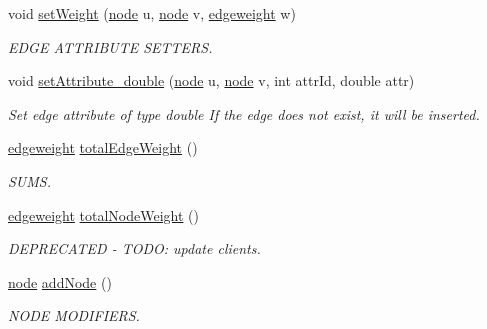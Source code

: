 \begin{DoxyCompactItemize}
\item 
void \hyperlink{class_ensemble_clustering_1_1_graph_a8e504170520b0746a2d169f82d863bab}{set\-Weight} (\hyperlink{namespace_ensemble_clustering_ae829290aeccd1a420b17a37fd901f114}{node} u, \hyperlink{namespace_ensemble_clustering_ae829290aeccd1a420b17a37fd901f114}{node} v, \hyperlink{namespace_ensemble_clustering_ab3fbffa545e4c22660e80229ca1a7d4a}{edgeweight} w)
\begin{DoxyCompactList}\small\item\em E\-D\-G\-E A\-T\-T\-R\-I\-B\-U\-T\-E S\-E\-T\-T\-E\-R\-S. \end{DoxyCompactList}\item 
void \hyperlink{class_ensemble_clustering_1_1_graph_aeac4bb9bf6ab0e0286a782a41a50178f}{set\-Attribute\-\_\-double} (\hyperlink{namespace_ensemble_clustering_ae829290aeccd1a420b17a37fd901f114}{node} u, \hyperlink{namespace_ensemble_clustering_ae829290aeccd1a420b17a37fd901f114}{node} v, int attr\-Id, double attr)
\begin{DoxyCompactList}\small\item\em Set edge attribute of type double If the edge does not exist, it will be inserted. \end{DoxyCompactList}\item 
\hyperlink{namespace_ensemble_clustering_ab3fbffa545e4c22660e80229ca1a7d4a}{edgeweight} \hyperlink{class_ensemble_clustering_1_1_graph_a7f748dbd6dcc6f5fcee7e3341bf872ac}{total\-Edge\-Weight} ()
\begin{DoxyCompactList}\small\item\em S\-U\-M\-S. \end{DoxyCompactList}\item 
\hyperlink{namespace_ensemble_clustering_ab3fbffa545e4c22660e80229ca1a7d4a}{edgeweight} \hyperlink{class_ensemble_clustering_1_1_graph_aebc51f859a41f829e71a793fee0e9a80}{total\-Node\-Weight} ()
\begin{DoxyCompactList}\small\item\em D\-E\-P\-R\-E\-C\-A\-T\-E\-D -\/ T\-O\-D\-O\-: update clients. \end{DoxyCompactList}\item 
\hyperlink{namespace_ensemble_clustering_ae829290aeccd1a420b17a37fd901f114}{node} \hyperlink{class_ensemble_clustering_1_1_graph_a1350eb5aaedcb02cec42af0398aadd7f}{add\-Node} ()
\begin{DoxyCompactList}\small\item\em N\-O\-D\-E M\-O\-D\-I\-F\-I\-E\-R\-S. \end{DoxyCompactList}\item 

\end{DoxyCompactItemize}
